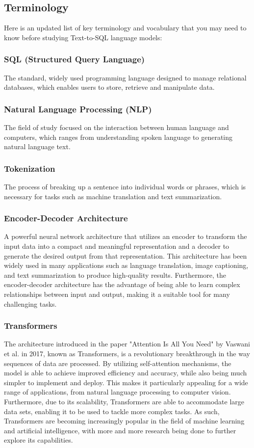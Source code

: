 \subsection{Terminology}

Here is an updated list of key terminology and vocabulary that you may need to know before studying Text-to-SQL language models:

\subsubsection{SQL (Structured Query Language)} The standard, widely used programming language designed to manage relational databases, which enables users to store, retrieve and manipulate data.
\subsubsection{Natural Language Processing (NLP)} The field of study focused on the interaction between human language and computers, which ranges from understanding spoken language to generating natural language text.
\subsubsection{Tokenization} The process of breaking up a sentence into individual words or phrases, which is necessary for tasks such as machine translation and text summarization.
\subsubsection{Encoder-Decoder Architecture} A powerful neural network architecture that utilizes an encoder to transform the input data into a compact and meaningful representation and a decoder to generate the desired output from that representation. This architecture has been widely used in many applications such as language translation, image captioning, and text summarization to produce high-quality results. Furthermore, the encoder-decoder architecture has the advantage of being able to learn complex relationships between input and output, making it a suitable tool for many challenging tasks.
\subsubsection{Transformers} The architecture introduced in the paper "Attention Is All You Need" by Vaswani et al. in 2017, known as Transformers, is a revolutionary breakthrough in the way sequences of data are processed. By utilizing self-attention mechanisms, the model is able to achieve improved efficiency and accuracy, while also being much simpler to implement and deploy. This makes it particularly appealing for a wide range of applications, from natural language processing to computer vision. Furthermore, due to its scalability, Transformers are able to accommodate large data sets, enabling it to be used to tackle more complex tasks. As such, Transformers are becoming increasingly popular in the field of machine learning and artificial intelligence, with more and more research being done to further explore its capabilities.
